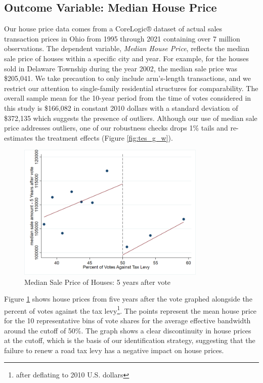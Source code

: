 \subsection{Outcome Variable: Median House Price}

Our house price data comes from a CoreLogic® dataset of actual sales transaction prices in Ohio from 1995 through 2021 containing over 7 million observations. The dependent variable, \textit{Median House Price}, reflects the median sale price of houses within a specific city and year. For example, for the houses sold in Delaware Township during the year 2002, the median sale price was \$205,041. We take precaution to only include arm’s-length transactions, and we restrict our attention to single-family residential structures for comparability.  The overall sample mean for the 10-year period from the time of votes considered in this study is \$166,082 in constant 2010 dollars with a standard deviation of \$372,135 which suggests the presence of outliers. Although our use of median sale price addresses outliers, one of our robustness checks drops 1\% tails and re-estimates the treatment effects (Figure \ref{fig:tes_g_w}).  

\begin{figure}[ht]
    \centering
    \includegraphics[width=0.8\textwidth,keepaspectratio]{images/rd_plot_year_5_after_vote.png}
    \caption{Median Sale Price of Houses: 5 years after vote}
    \label{fig:hp_year5_after}
\end{figure}

Figure \ref{fig:hp_year5_after} shows house prices from five years after the vote graphed alongside the percent of votes against the tax levy\footnote{after deflating to 2010 U.S. dollars}. The points represent the mean house price for the 10 representative bins of vote shares for the average effective bandwidth around the cutoff of 50\%. The graph shows a clear discontinuity in house prices at the cutoff, which is the basis of our identification strategy, suggesting that the failure to renew a road tax levy has a negative impact on house prices.

